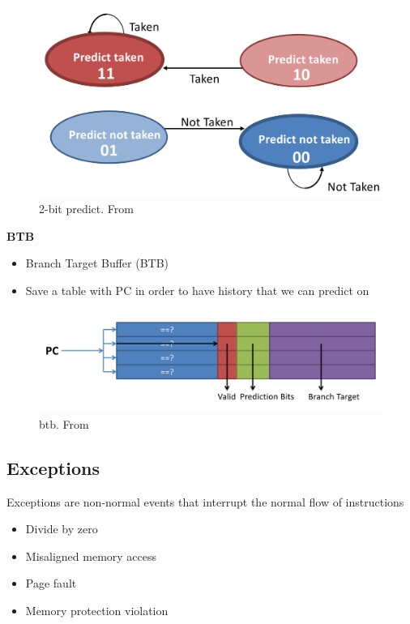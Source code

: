 \begin{figure}[H]
    \centering
    \includegraphics[width=14cm]{image/2-bit-predict.png} 
    \caption{2-bit predict. From \cite{ca}}
\end{figure}


\textbf{BTB}
\begin{itemize}
\item  Branch Target Buffer (BTB)
\item  Save a table with PC in order to have history that we can predict on
\end{itemize}

\begin{figure}[H]
    \centering
    \includegraphics[width=16cm]{image/btb.png} 
    \caption{btb. From \cite{ca}}
\end{figure}


\subsection{Exceptions}
Exceptions are non-normal events that interrupt the normal flow of instructions
\begin{itemize}
\item  Divide by zero
\item  Misaligned memory access
\item  Page fault
\item  Memory protection violation
\end{itemize}

